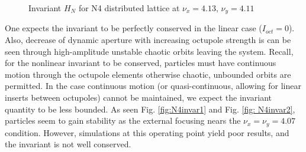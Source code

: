 \begin{figure}[]
 	\caption{Invariant $H_N$ for N4 distributed lattice at $\nu_x=4.13$, $\nu_y=4.11$}
    \label{fig:N4invar2}
\end{figure}

One expects the invariant to be perfectly conserved in the linear case ($I_{oct}=0$). Also, decrease of dynamic aperture with increasing octupole strength is can be seen through high-amplitude unstable chaotic orbits leaving the system. Recall, for the nonlinear invariant to be conserved, particles must have continuous motion through the octupole elements otherwise chaotic, unbounded orbits are permitted.\cite{Danilov2010} In the case continuous motion (or quasi-continuous, allowing for linear inserts between octupoles) cannot be maintained, we expect the invariant quantity to be less bounded. As seen Fig. \ref{fig:N4invar1} and Fig. \ref{fig: N4invar2}, particles seem to gain stability as the external focusing nears the $\nu_x=\nu_y=4.07$ condition. However, simulations at this operating point yield poor results, and the invariant is not well conserved. 

